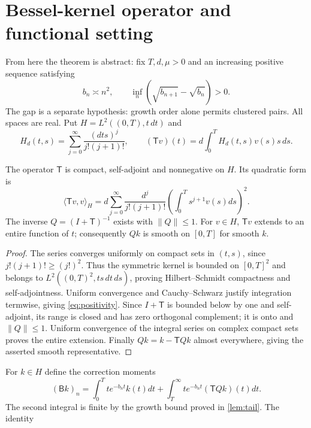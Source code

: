 \section{Bessel-kernel operator and functional setting}\label{sec:setting}
From here the theorem is abstract: fix \(T,d,\mu>0\) and an increasing positive sequence satisfying
\begin{equation}\label{eq:growth}
b_n\asymp n^2,\qquad \inf_n(\sqrt{b_{n+1}}-\sqrt{b_n})>0.
\end{equation}
The gap is a separate hypothesis: growth order alone permits clustered pairs. All spaces are real. Put \(H=L^2((0,T),t\,dt)\) and
\begin{equation}\label{eq:kernel}
H_d(t,s)=\sum_{j=0}^\infty\frac{(dts)^j}{j!(j+1)!},\qquad
(\mathsf Tv)(t)=d\int_0^T H_d(t,s)v(s)s\,ds.
\end{equation}
\begin{lemma}\label{lem:positive}
The operator \(\mathsf T\) is compact, self-adjoint and nonnegative on \(H\). Its quadratic form is
\begin{equation}\label{eq:positivity}
\langle\mathsf Tv,v\rangle_H=d\sum_{j=0}^\infty\frac{d^j}{j!(j+1)!}\left(\int_0^T s^{j+1}v(s)ds\right)^2.
\end{equation}
The inverse \(Q=(I+\mathsf T)^{-1}\) exists with \(\|Q\|\le1\). For \(v\in H\), \(\mathsf Tv\) extends to an entire function of \(t\); consequently \(Qk\) is smooth on \([0,T]\) for smooth \(k\).
\end{lemma}
\begin{proof}
The series converges uniformly on compact sets in \((t,s)\), since \(j!(j+1)!\ge(j!)^2\). Thus the symmetric kernel is bounded on \([0,T]^2\) and belongs to \(L^2((0,T)^2,ts\,dt\,ds)\), proving Hilbert--Schmidt compactness and self-adjointness. Uniform convergence and Cauchy--Schwarz justify integration termwise, giving \eqref{eq:positivity}. Since \(I+\mathsf T\) is bounded below by one and self-adjoint, its range is closed and has zero orthogonal complement; it is onto and \(\|Q\|\le1\). Uniform convergence of the integral series on complex compact sets proves the entire extension. Finally \(Qk=k-\mathsf TQk\) almost everywhere, giving the asserted smooth representative.
\end{proof}
For \(k\in H\) define the correction moments
\begin{equation}\label{eq:B}
(\mathsf Bk)_n=\int_0^T te^{-b_nt}k(t)dt+
\int_T^\infty te^{-b_nt}(\mathsf TQk)(t)dt.
\end{equation}
The second integral is finite by the growth bound proved in \cref{lem:tail}. The identity
